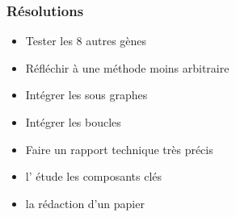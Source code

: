 
\begin{frame}[c]
  \frametitle{Résolutions}
 
 
\begin{itemize}
  \item Tester les 8 autres gènes
  \item Réfléchir à une méthode moins arbitraire
  \item Intégrer les sous graphes
  \item Intégrer les boucles
  \item Faire un rapport technique très précis
\end{itemize}

\begin{itemize}
 \item l' étude les composants clés
 \item la rédaction d'un papier
\end{itemize}





\end{frame}


